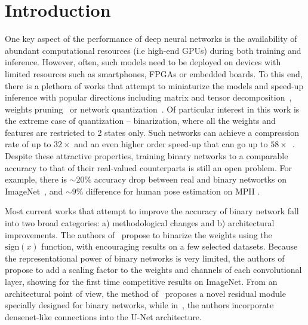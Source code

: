 \documentclass[10pt,twocolumn,letterpaper]{article}
\begin{document}
\section{Introduction}\label{sec:introduction}

One key aspect of the performance of deep neural networks is the availability of abundant computational resources (i.e high-end GPUs) during both training and inference. However, often, such models need to be deployed on devices with limited resources such as smartphones, FPGAs or embedded boards. To this end, there is a plethora of works that attempt to miniaturize the models and speed-up inference with popular directions including matrix and tensor decomposition~\cite{lebedev2014speeding,kim2015compression}, weights pruning~\cite{han2015learning} or network quantization~\cite{courbariaux2014training,lin2015fixed}. Of particular interest in this work is the extreme case of quantization -- binarization, where all the weights and features are restricted to 2 states only. Such networks can achieve a compression rate of up to $32\times$ and an even higher order speed-up that can go up to $58\times$~\cite{rastegari2016xnor,courbariaux2015binaryconnect}. 
Despite these attractive properties, training binary networks to a comparable accuracy to that of their real-valued counterparts is still an open problem. For example, there is $ \sim 20 \%$ accuracy drop between real and binary networtks on ImageNet~\cite{rastegari2016xnor}, and $ \sim 9 \%$ difference for human pose estimation on MPII \cite{bulat2017binarized}.    

Most current works that attempt to improve the accuracy of binary network fall into two broad categories: a) methodological changes and b) architectural improvements. The authors of~\cite{courbariaux2015binaryconnect} propose to binarize the weights using the $\text{sign}(x)$ function, with encouraging results on a few selected datasets. Because the representational power of binary networks is very limited, the authors of~\cite{rastegari2016xnor} propose to add a scaling factor to the weights and channels of each convolutional layer, showing for the first time competitive results on ImageNet. From an architectural point of view, the method of~\cite{bulat2017binarized} proposes a novel residual module specially designed for binary networks, while in~\cite{tang2018quantized}, the authors incorporate  densenet-like connections into the U-Net architecture.
\end{document}
